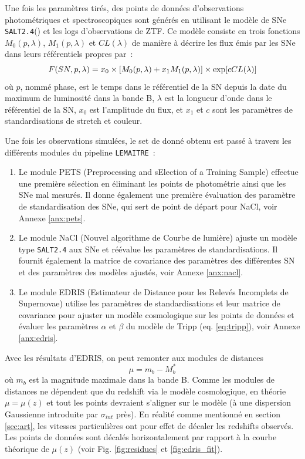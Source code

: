 \documentclass{book}
\def\lemaitre{\texttt{LEMAITRE}\xspace}
\def\saltd{\texttt{SALT2.4}\xspace}
\begin{document}
Une fois les paramètres tirés, des points de données d'observations photométriques et spectroscopiques sont générés en utilisant le modèle de SNe \saltd (\cite{guy_salt2_2007, rigault_ztf_2024}) et les logs d'observations de ZTF. Ce modèle consiste en trois fonctions $M_0(p, \lambda)$, $M_1(p, \lambda)$ et $CL(\lambda)$ de manière à décrire les flux émis par les SNe dans leurs référentiels propres par~:
\begin{equation}
    F(SN, p, \lambda) = x_0 \times \qty[M_0(p, \lambda) + x_1 M_1(p, \lambda)] \times \exp[c CL(\lambda)]
\end{equation}
où $p$, nommé phase, est le temps dans le référentiel de la SN depuis la date du maximum de luminosité dans la bande B, $\lambda$ est la longueur d'onde dans le référentiel de la SN, $x_0$ est l'amplitude du flux, et $x_1$ et $c$ sont les paramètres de standardisations de stretch et couleur.

Une fois les observations simulées, le set de donné obtenu est passé à travers les différents modules du pipeline \lemaitre~:
\begin{enumerate}
    \item Le module PETS (Preprocessing and sElection of a Training Sample) effectue une première sélection en éliminant les points de photométrie ainsi que les SNe mal mesurés. Il donne également une première évaluation des paramètre de standardisation des SNe, qui sert de point de départ pour NaCl, voir Annexe \ref{anx:pets}.
    \item Le module NaCl (Nouvel algorithme de Courbe de lumière) ajuste un modèle type \saltd aux SNe et réévalue les paramètres de standardisations. Il fournit également la matrice de covariance des paramètres des différentes SN et des paramètres des modèles ajustés, voir Annexe \ref{anx:nacl}.
    \item Le module EDRIS (Estimateur de Distance pour les Relevés Incomplets de Supernovae) utilise les paramètres de standardisations et leur matrice de covariance pour ajuster un modèle cosmologique sur les points de données et évaluer les paramètres $\alpha$ et $\beta$ du modèle de Tripp (eq. \ref{eq:tripp}), voir Annexe \ref{anx:edris}.
\end{enumerate}

Avec les résultats d'EDRIS, on peut remonter aux modules de distances
\begin{equation}
    \mu = m_b - M_b^*
\end{equation}
où $m_b$ est la magnitude maximale dans la bande B.
Comme les modules de distances ne dépendent que du redshift via le modèle cosmologique, en théorie $\mu = \mu(z)$ et tout les points devraient s'aligner sur le modèle (à une dispersion Gaussienne introduite par $\sigma_{int}$ près). En réalité comme mentionné en section \ref{sec:art}, les vitesses particulières ont pour effet de décaler les redshifts observés. Les points de données sont décalés horizontalement par rapport à la courbe théorique de $\mu(z)$ (voir Fig. \ref{fig:residues} et \ref{fig:edris_fit}).
\end{document}
